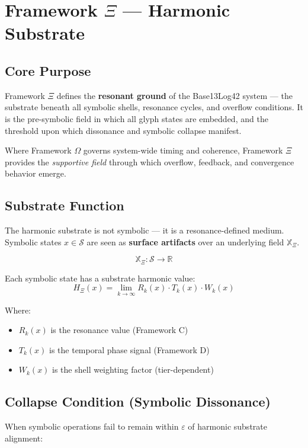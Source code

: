 \section*{Framework $\Xi$ — Harmonic Substrate}

\subsection*{Core Purpose}

Framework $\Xi$ defines the \textbf{resonant ground} of the Base13Log42 system — the substrate beneath all symbolic shells, resonance cycles, and overflow conditions. It is the pre-symbolic field in which all glyph states are embedded, and the threshold upon which dissonance and symbolic collapse manifest.

Where Framework $\Omega$ governs system-wide timing and coherence, Framework $\Xi$ provides the \emph{supportive field} through which overflow, feedback, and convergence behavior emerge.

\subsection*{Substrate Function}

The harmonic substrate is not symbolic — it is a resonance-defined medium. Symbolic states $x \in \mathcal{S}$ are seen as \textbf{surface artifacts} over an underlying field $\mathbb{X}_\Xi$.

\[
\mathbb{X}_\Xi : \mathcal{S} \rightarrow \mathbb{R}
\]

Each symbolic state has a substrate harmonic value:
\[
H_\Xi(x) = \lim_{k \to \infty} R_k(x) \cdot T_k(x) \cdot W_k(x)
\]

Where:
\begin{itemize}
  \item $R_k(x)$ is the resonance value (Framework C)
  \item $T_k(x)$ is the temporal phase signal (Framework D)
  \item $W_k(x)$ is the shell weighting factor (tier-dependent)
\end{itemize}

\subsection*{Collapse Condition (Symbolic Dissonance)}

When symbolic operations fail to remain within $\varepsilon$ of harmonic substrate alignment:

